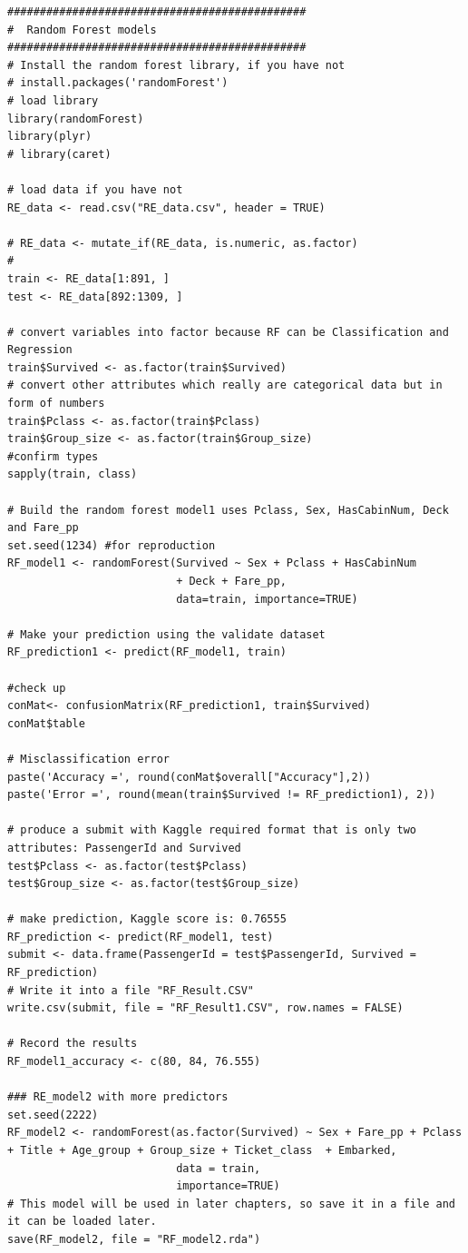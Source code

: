 \documentclass[
]{book}
\begin{document}
\begin{verbatim}
##############################################
#  Random Forest models
##############################################
# Install the random forest library, if you have not
# install.packages('randomForest')
# load library
library(randomForest)
library(plyr)
# library(caret)

# load data if you have not
RE_data <- read.csv("RE_data.csv", header = TRUE)

# RE_data <- mutate_if(RE_data, is.numeric, as.factor)
#
train <- RE_data[1:891, ]
test <- RE_data[892:1309, ]

# convert variables into factor because RF can be Classification and Regression
train$Survived <- as.factor(train$Survived)
# convert other attributes which really are categorical data but in form of numbers
train$Pclass <- as.factor(train$Pclass)
train$Group_size <- as.factor(train$Group_size)
#confirm types
sapply(train, class)

# Build the random forest model1 uses Pclass, Sex, HasCabinNum, Deck and Fare_pp
set.seed(1234) #for reproduction
RF_model1 <- randomForest(Survived ~ Sex + Pclass + HasCabinNum
                          + Deck + Fare_pp,
                          data=train, importance=TRUE)

# Make your prediction using the validate dataset
RF_prediction1 <- predict(RF_model1, train)

#check up
conMat<- confusionMatrix(RF_prediction1, train$Survived)
conMat$table

# Misclassification error
paste('Accuracy =', round(conMat$overall["Accuracy"],2))
paste('Error =', round(mean(train$Survived != RF_prediction1), 2))

# produce a submit with Kaggle required format that is only two attributes: PassengerId and Survived
test$Pclass <- as.factor(test$Pclass)
test$Group_size <- as.factor(test$Group_size)

# make prediction, Kaggle score is: 0.76555
RF_prediction <- predict(RF_model1, test)
submit <- data.frame(PassengerId = test$PassengerId, Survived = RF_prediction)
# Write it into a file "RF_Result.CSV"
write.csv(submit, file = "RF_Result1.CSV", row.names = FALSE)

# Record the results
RF_model1_accuracy <- c(80, 84, 76.555)

### RE_model2 with more predictors
set.seed(2222)
RF_model2 <- randomForest(as.factor(Survived) ~ Sex + Fare_pp + Pclass + Title + Age_group + Group_size + Ticket_class  + Embarked,
                          data = train,
                          importance=TRUE)
# This model will be used in later chapters, so save it in a file and it can be loaded later.
save(RF_model2, file = "RF_model2.rda")


\end{verbatim}
\end{document}
